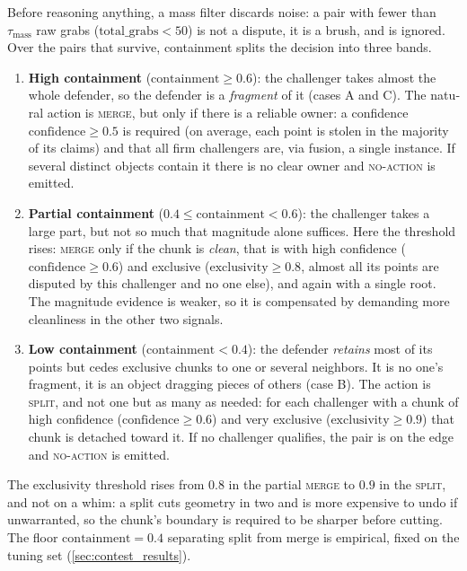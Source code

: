 \begin{otherlanguage}{english}
Before reasoning anything, a mass filter discards noise: a pair with fewer than $\tau_{\text{mass}}$
raw grabs ($\mathrm{total\_grabs} < 50$) is not a dispute, it is a brush, and is ignored. Over the
pairs that survive, containment splits the decision into three bands.

\begin{enumerate}
  \item \textbf{High containment} ($\mathrm{containment} \geq 0.6$): the challenger takes almost the
  whole defender, so the defender is a \emph{fragment} of it (cases A and C). The natural action is
  \textsc{merge}, but only if there is a reliable owner: a confidence $\mathrm{confidence} \geq 0.5$
  is required (on average, each point is stolen in the majority of its claims) and that all firm
  challengers are, via fusion, a single instance. If several distinct objects contain it there is no
  clear owner and \textsc{no-action} is emitted.

  \item \textbf{Partial containment} ($0.4 \leq \mathrm{containment} < 0.6$): the challenger takes a
  large part, but not so much that magnitude alone suffices. Here the threshold rises: \textsc{merge}
  only if the chunk is \emph{clean}, that is with high confidence ($\mathrm{confidence} \geq 0.6$)
  and exclusive ($\mathrm{exclusivity} \geq 0.8$, almost all its points are disputed by this
  challenger and no one else), and again with a single root. The magnitude evidence is weaker, so it
  is compensated by demanding more cleanliness in the other two signals.

  \item \textbf{Low containment} ($\mathrm{containment} < 0.4$): the defender \emph{retains} most of
  its points but cedes exclusive chunks to one or several neighbors. It is no one's fragment, it is
  an object dragging pieces of others (case B). The action is \textsc{split}, and not one but as many
  as needed: for each challenger with a chunk of high confidence ($\mathrm{confidence} \geq 0.6$) and
  very exclusive ($\mathrm{exclusivity} \geq 0.9$) that chunk is detached toward it. If no challenger
  qualifies, the pair is on the edge and \textsc{no-action} is emitted.
\end{enumerate}

The exclusivity threshold rises from $0.8$ in the partial \textsc{merge} to $0.9$ in the
\textsc{split}, and not on a whim: a split cuts geometry in two and is more expensive to undo if
unwarranted, so the chunk's boundary is required to be sharper before cutting. The floor
$\mathrm{containment} = 0.4$ separating split from merge is empirical, fixed on the tuning set
(\ref{sec:contest_results}).


\end{otherlanguage}
